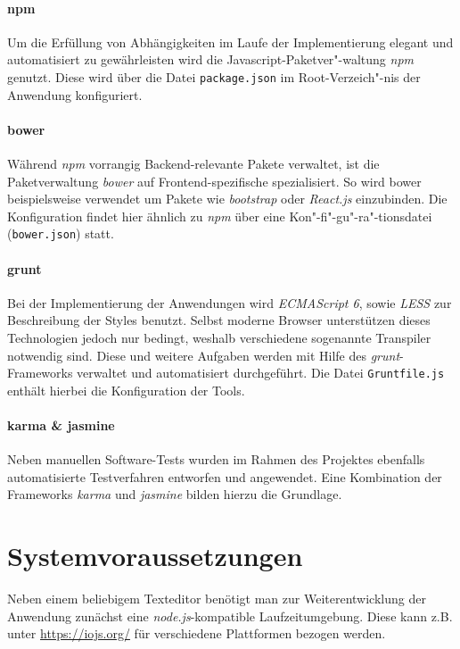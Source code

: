 \paragraph{npm}
Um die Erfüllung von Abhängigkeiten im Laufe der Implementierung elegant und automatisiert zu gewährleisten wird die Javascript-Paketver"-waltung \textit{npm} genutzt.
Diese wird über die Datei \texttt{package.json} im Root-Verzeich"-nis der Anwendung konfiguriert.

\paragraph{bower}
Während \textit{npm} vorrangig Backend-relevante Pakete verwaltet, ist die Paketverwaltung \textit{bower} auf Frontend-spezifische spezialisiert.
So wird bower beispielsweise verwendet um Pakete wie \textit{bootstrap} oder \textit{React.js} einzubinden.
Die Konfiguration findet hier ähnlich zu \textit{npm} über eine Kon"-fi"-gu"-ra"-tionsdatei (\texttt{bower.json}) statt.

\paragraph{grunt}
Bei der Implementierung der Anwendungen wird \textit{ECMAScript 6}, sowie \textit{LESS} zur Beschreibung der Styles benutzt.
Selbst moderne Browser unterstützen dieses Technologien jedoch nur bedingt, weshalb verschiedene sogenannte Transpiler notwendig sind.
Diese und weitere Aufgaben werden mit Hilfe des \textit{grunt}-Frameworks verwaltet und automatisiert durchgeführt.
Die Datei \texttt{Gruntfile.js} enthält hierbei die Konfiguration der Tools.

\paragraph{karma \& jasmine}
Neben manuellen Software-Tests wurden im Rahmen des Projektes ebenfalls automatisierte Testverfahren entworfen und angewendet.
Eine Kombination der Frameworks \textit{karma} und \textit{jasmine} bilden hierzu die Grundlage.


\section{Systemvoraussetzungen}
Neben einem beliebigem Texteditor benötigt man zur Weiterentwicklung der Anwendung zunächst eine \textit{node.js}-kompatible Laufzeitumgebung. Diese kann z.B. unter \url{https://iojs.org/} für verschiedene Plattformen bezogen werden.


